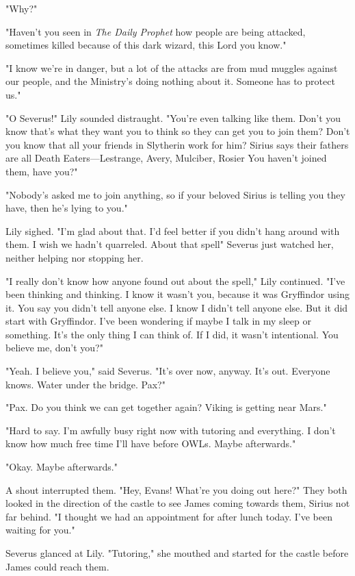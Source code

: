 "Why?"

"Haven't you seen in \emph{The Daily Prophet} how people are being attacked, sometimes killed because of this dark wizard, this Lord{\el} you know."

"I know we're in danger, but a lot of the attacks are from mud{\el} muggles against our people, and the Ministry's doing nothing about it. Someone has to protect us."

"O Severus!" Lily sounded distraught. "You're even talking like them. Don't you know that's what they want you to think so they can get you to join them? Don't you know that all your friends in Slytherin work for him? Sirius says their fathers are all Death Eaters—Lestrange, Avery, Mulciber, Rosier{\el} You haven't joined them, have you?"

"Nobody's asked me to join anything, so if your beloved Sirius is telling you they have, then he's lying to you."

Lily sighed. "I'm glad about that. I'd feel better if you didn't hang around with them. I wish we hadn't quarreled. About that spell{\el}" Severus just watched her, neither helping nor stopping her.

"I really don't know how anyone found out about the spell," Lily continued. "I've been thinking and thinking. I know it wasn't you, because it was Gryffindor using it. You say you didn't tell anyone else. I know I didn't tell anyone else. But it did start with Gryffindor. I've been wondering if maybe I talk in my sleep or something. It's the only thing I can think of. If I did, it wasn't intentional. You believe me, don't you?"

"Yeah. I believe you," said Severus. "It's over now, anyway. It's out. Everyone knows. Water under the bridge. Pax?"

"Pax. Do you think we can get together again? Viking is getting near Mars."

"Hard to say. I'm awfully busy right now with tutoring and everything. I don't know how much free time I'll have before OWLs. Maybe afterwards."

"Okay. Maybe afterwards."

A shout interrupted them. "Hey, Evans! What're you doing out here?" They both looked in the direction of the castle to see James coming towards them, Sirius not far behind. "I thought we had an appointment for after lunch today. I've been waiting for you."

Severus glanced at Lily. "Tutoring," she mouthed and started for the castle before James could reach them.

